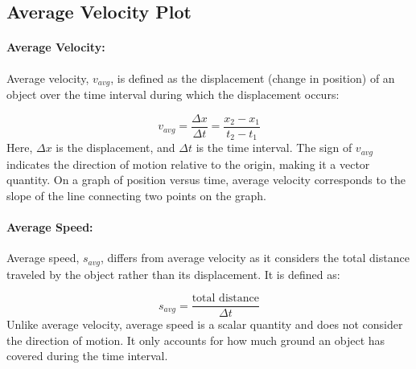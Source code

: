\documentclass{article}
\begin{document}
\begin{center}
\section*{Average Velocity Plot}
\end{center}

\paragraph{Average Velocity:}
Average velocity, $v_{avg}$, is defined as the displacement (change in position) of an object over the time interval during which the displacement occurs:

\[
v_{avg} = \frac{\Delta x}{\Delta t} = \frac{x_2 - x_1}{t_2 - t_1}
\]
Here, $\Delta x$ is the displacement, and $\Delta t$ is the time interval. The sign of $v_{avg}$ indicates the direction of motion relative to the origin, making it a vector quantity. On a graph of position versus time, average velocity corresponds to the slope of the line connecting two points on the graph.

\paragraph{Average Speed:}
Average speed, $s_{avg}$, differs from average velocity as it considers the total distance traveled by the object rather than its displacement. It is defined as:

\[
s_{avg} = \frac{\text{total distance}}{\Delta t}
\]
Unlike average velocity, average speed is a scalar quantity and does not consider the direction of motion. It only accounts for how much ground an object has covered during the time interval.
\end{document}
